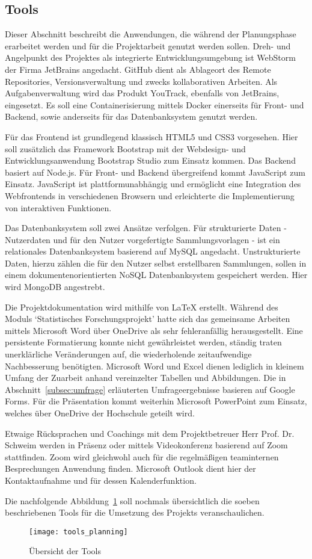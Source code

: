 \subsection{Tools}\label{subsec:Tools}
Dieser Abschnitt beschreibt die Anwendungen, die während der Planungsphase erarbeitet werden und für die Projektarbeit genutzt werden sollen.
Dreh- und Angelpunkt des Projektes als integrierte Entwicklungsumgebung ist WebStorm der Firma JetBrains angedacht.
GitHub dient als Ablageort des Remote Repositories, Versionsverwaltung und zwecks kollaborativen Arbeiten.
Als Aufgabenverwaltung wird das Produkt YouTrack, ebenfalls von JetBrains, eingesetzt.
Es soll eine Containerisierung mittels Docker einerseits für Front- und Backend, sowie anderseits für das Datenbanksystem genutzt werden.

Für das Frontend ist grundlegend klassisch HTML5 und CSS3 vorgesehen.
Hier soll zusätzlich das Framework Bootstrap mit der Webdesign- und Entwicklungsanwendung Bootstrap Studio zum Einsatz kommen.
Das Backend basiert auf Node.js.
Für Front- und Backend übergreifend kommt JavaScript zum Einsatz.
JavaScript ist plattformunabhängig und ermöglicht eine Integration des Webfrontends in verschiedenen Browsern und erleichterte die Implementierung von interaktiven Funktionen.

Das Datenbanksystem soll zwei Ansätze verfolgen.
Für strukturierte Daten - Nutzerdaten und für den Nutzer vorgefertigte Sammlungsvorlagen - ist ein relationales Datenbanksystem basierend auf MySQL angedacht.
Unstrukturierte Daten, hierzu zählen die für den Nutzer selbst erstellbaren Sammlungen, sollen in einem dokumentenorientierten NoSQL Datenbanksystem gespeichert werden.
Hier wird MongoDB angestrebt.

Die Projektdokumentation wird mithilfe von LaTeX erstellt.
Während des Moduls `Statistisches Forschungsprojekt' hatte sich das gemeinsame Arbeiten mittels Microsoft Word über OneDrive als sehr fehleranfällig herausgestellt.
Eine persistente Formatierung konnte nicht gewährleistet werden, ständig traten unerklärliche Veränderungen auf, die wiederholende zeitaufwendige Nachbesserung benötigten.
Microsoft Word und Excel dienen lediglich in kleinem Umfang der Zuarbeit anhand vereinzelter Tabellen und Abbildungen.
Die in Abschnitt~\ref{subsec:umfrage} erläuterten Umfrageergebnisse basieren auf Google Forms.
Für die Präsentation kommt weiterhin Microsoft PowerPoint zum Einsatz, welches über OneDrive der Hochschule geteilt wird.

Etwaige Rücksprachen und Coachings mit dem Projektbetreuer Herr Prof. Dr. Schweim werden in Präsenz oder mittels Videokonferenz basierend auf Zoom stattfinden.
Zoom wird gleichwohl auch für die regelmäßigen teaminternen Besprechungen Anwendung finden.
Microsoft Outlook dient hier der Kontaktaufnahme und für dessen Kalenderfunktion.

Die nachfolgende Abbildung~\ref{fig:uebersicht-tools} soll nochmals übersichtlich die soeben beschriebenen Tools für die Umsetzung des Projekts veranschaulichen.

\begin{figure}[H]
    \centering
    \texttt{[image: tools\_planning]}
    \caption{Übersicht der Tools}\label{fig:uebersicht-tools}
\end{figure}
